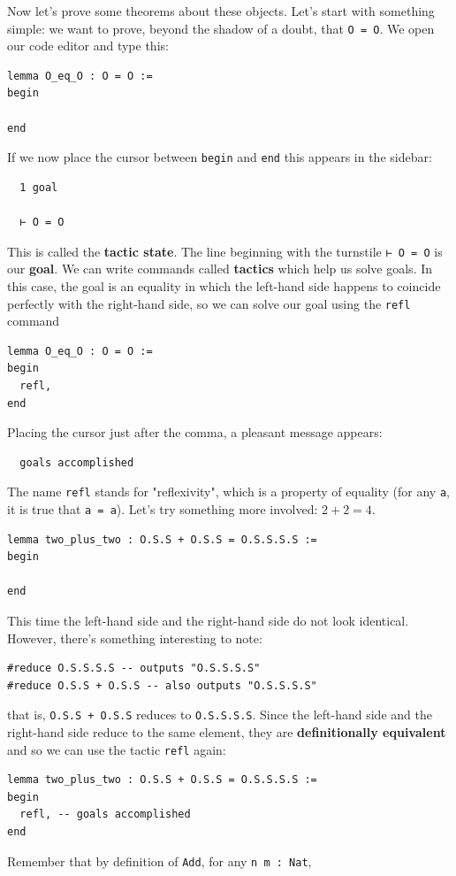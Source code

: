 \documentclass[oneside]{book}
\theoremstyle{definition}
\theoremstyle{remark}
\theoremstyle{plain}
\begin{document}
Now let's prove some theorems about these objects.
Let's start with something simple: we want to prove,
beyond the shadow of a doubt, that \lstinline{O = O}.
We open our code editor and type this:
\begin{lstlisting}
lemma O_eq_O : O = O :=
begin

end
\end{lstlisting}
If we now place the cursor between \lstinline{begin} and \lstinline{end}
this appears in the sidebar:
\begin{lstlisting}
  1 goal
  
  ⊢ O = O
\end{lstlisting}
This is called the \textbf{tactic state}.
The line beginning with the turnstile \lstinline{⊢ O = O} is our \textbf{goal}.
We can write commands called \textbf{tactics} which help us solve goals.
In this case, the goal is an equality in which the left-hand side happens to coincide perfectly with the right-hand side,
so we can solve our goal using the \lstinline{refl} command
\begin{lstlisting}
lemma O_eq_O : O = O :=
begin
  refl,
end
\end{lstlisting}
Placing the cursor just after the comma, a pleasant message appears:
\begin{lstlisting}
  goals accomplished
\end{lstlisting}
The name \lstinline{refl} stands for "reflexivity",
which is a property of equality (for any \lstinline{a}, it is true that \lstinline{a = a}).
Let's try something more involved: $2 + 2 = 4$.
\begin{lstlisting}
lemma two_plus_two : O.S.S + O.S.S = O.S.S.S.S :=
begin

end
\end{lstlisting}
This time the left-hand side and the right-hand side do not look identical.
However, there's something interesting to note:
\begin{lstlisting}
#reduce O.S.S.S.S -- outputs "O.S.S.S.S"
#reduce O.S.S + O.S.S -- also outputs "O.S.S.S.S"
\end{lstlisting}
that is, \lstinline{O.S.S + O.S.S} reduces to \lstinline{O.S.S.S.S}.
Since the left-hand side and the right-hand side reduce to the same element,
they are \textbf{definitionally equivalent} and so we can use the tactic \lstinline{refl} again:
\begin{lstlisting}
lemma two_plus_two : O.S.S + O.S.S = O.S.S.S.S :=
begin
  refl, -- goals accomplished
end
\end{lstlisting}
Remember that by definition of \lstinline{Add}, for any \lstinline{n m : Nat},
\end{document}
